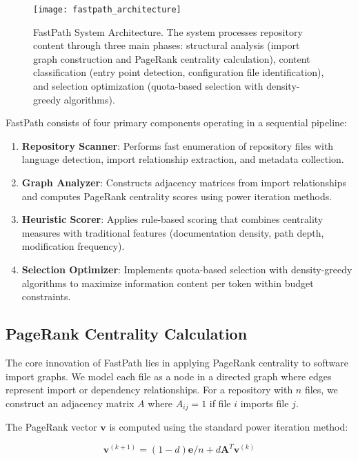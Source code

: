 \documentclass[conference]{IEEEtran}
\begin{document}
\begin{figure}[t]
\centering
\texttt{[image: fastpath\_architecture]}
\caption{FastPath System Architecture. The system processes repository content through three main phases: structural analysis (import graph construction and PageRank centrality calculation), content classification (entry point detection, configuration file identification), and selection optimization (quota-based selection with density-greedy algorithms).}
\label{fig:architecture}
\end{figure}

FastPath consists of four primary components operating in a sequential pipeline:

\begin{enumerate}
\item \textbf{Repository Scanner}: Performs fast enumeration of repository files with language detection, import relationship extraction, and metadata collection.

\item \textbf{Graph Analyzer}: Constructs adjacency matrices from import relationships and computes PageRank centrality scores using power iteration methods.

\item \textbf{Heuristic Scorer}: Applies rule-based scoring that combines centrality measures with traditional features (documentation density, path depth, modification frequency).

\item \textbf{Selection Optimizer}: Implements quota-based selection with density-greedy algorithms to maximize information content per token within budget constraints.
\end{enumerate}

\subsection{PageRank Centrality Calculation}

The core innovation of FastPath lies in applying PageRank centrality to software import graphs. We model each file as a node in a directed graph where edges represent import or dependency relationships. For a repository with $n$ files, we construct an adjacency matrix $A$ where $A_{ij} = 1$ if file $i$ imports file $j$.

The PageRank vector $\mathbf{v}$ is computed using the standard power iteration method:

\begin{equation}
\mathbf{v}^{(k+1)} = (1-d) \mathbf{e}/n + d \mathbf{A}^T \mathbf{v}^{(k)}
\end{equation}
\end{document}

